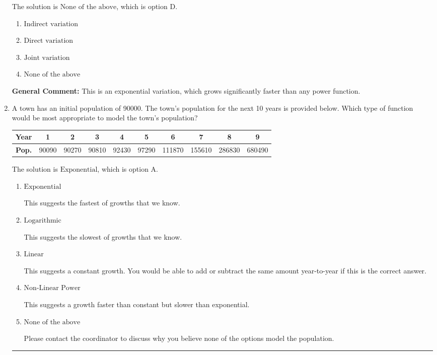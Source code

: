 \documentclass{extbook}[14pt]
\newcommand{\litem}[1]{\item #1

\rule{\textwidth}{0.4pt}}
\begin{document}
\begin{enumerate}
{The solution is \( \text{None of the above} \), which is option D.\begin{enumerate}[label=\Alph*.]
\item \( \text{Indirect variation} \)


\item \( \text{Direct variation} \)


\item \( \text{Joint variation} \)


\item \( \text{None of the above} \)


\end{enumerate}

\textbf{General Comment:} This is an exponential variation, which grows significantly faster than any power function.
}
\litem{
A town has an initial population of 90000. The town's population for the next 10 years is provided below. Which type of function would be most appropriate to model the town's population?



\begin{tabular}{c|c|c|c|c|c|c|c|c|c}
\textbf{Year} & 1 & 2 & 3 & 4 & 5 & 6 & 7 & 8 & 9 \tabularnewline
\hline
\textbf{Pop.} & 90090 & 90270 & 90810 & 92430 & 97290 & 111870 & 155610 & 286830 & 680490
\end{tabular} 

The solution is \( \text{Exponential} \), which is option A.\begin{enumerate}[label=\Alph*.]
\item \( \text{Exponential} \)

This suggests the fastest of growths that we know.
\item \( \text{Logarithmic} \)

This suggests the slowest of growths that we know.
\item \( \text{Linear} \)

This suggests a constant growth. You would be able to add or subtract the same amount year-to-year if this is the correct answer.
\item \( \text{Non-Linear Power} \)

This suggests a growth faster than constant but slower than exponential.
\item \( \text{None of the above} \)

Please contact the coordinator to discuss why you believe none of the options model the population.
\end{enumerate}

}
\end{enumerate}
\end{document}
